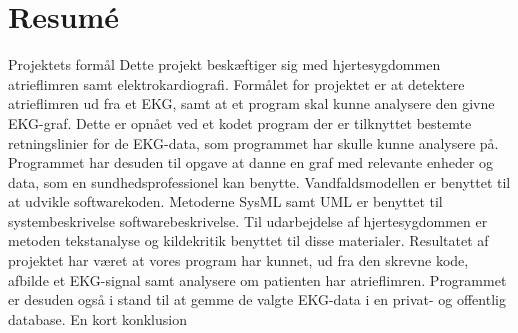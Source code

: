 \chapter{Resumé}

Projektets formål
Dette projekt beskæftiger sig med hjertesygdommen atrieflimren samt elektrokardiografi. Formålet for projektet er at detektere atrieflimren ud fra et EKG, samt at et program skal kunne analysere den givne EKG-graf. Dette er opnået ved et kodet program der er tilknyttet bestemte retningslinier for de EKG-data, som programmet har skulle kunne analysere på. Programmet har desuden til opgave at danne en graf med relevante enheder og data, som en sundhedsprofessionel kan benytte. Vandfaldsmodellen er benyttet til at udvikle softwarekoden. Metoderne SysML samt UML er benyttet til systembeskrivelse softwarebeskrivelse. Til udarbejdelse af hjertesygdommen er metoden tekstanalyse og kildekritik benyttet til disse materialer. Resultatet af projektet har været at vores program har kunnet, ud fra den skrevne kode, afbilde et EKG-signal samt analysere om patienten har atrieflimren. Programmet er desuden også i stand til at gemme de valgte EKG-data i en privat- og offentlig database.
En kort konklusion 
